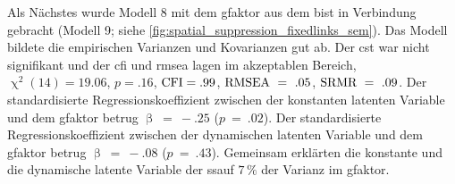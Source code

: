 \documentclass[11pt, twoside, a4paper]{book}		%
\begin{document}
Als Nächstes wurde Modell 8 mit dem \gls{gfaktor} aus dem \gls{bist} in Verbindung gebracht (Modell 9; siehe \autoref{fig:spatial_suppression_fixedlinks_sem}).
Das Modell bildete die empirischen Varianzen und Kovarianzen gut ab. Der \gls{cst} war nicht signifikant und der \gls{cfi} und \gls{rmsea} lagen im akzeptablen Bereich, $\upchi^2(14)=19.06$, $p=.16$, $\textnormal{CFI}=.99$, $\textnormal{RMSEA}~=~.05$, $\textnormal{SRMR}~=~.09$. 
Der standardisierte Regressionskoeffizient zwischen der konstanten latenten Variable und dem \gls{gfaktor} betrug $\upbeta~=~-.25$ ($p~=~.02$). Der standardisierte Regressionskoeffizient zwischen der dynamischen latenten Variable und dem \gls{gfaktor} betrug $\upbeta~=~-.08$ ($p~=~.43$).
Gemeinsam erklärten die konstante und die dynamische latente Variable der \gls{ssauf} $7\,\%$ der Varianz im \gls{gfaktor}.
\end{document}
